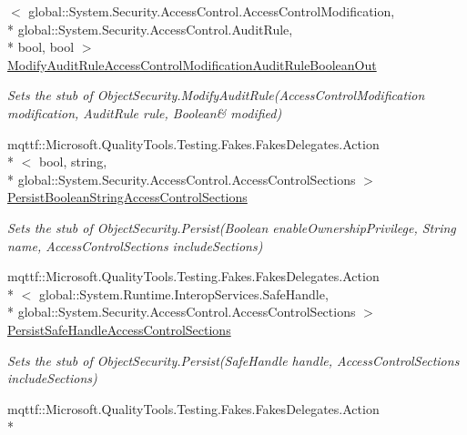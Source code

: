 \begin{DoxyCompactItemize}
$<$ global\-::\-System.\-Security.\-Access\-Control.\-Access\-Control\-Modification, \\*
global\-::\-System.\-Security.\-Access\-Control.\-Audit\-Rule, \\*
bool, bool $>$ \hyperlink{class_system_1_1_security_1_1_access_control_1_1_fakes_1_1_stub_common_object_security_aa82b9f88a60e569e45ced048289bab06}{Modify\-Audit\-Rule\-Access\-Control\-Modification\-Audit\-Rule\-Boolean\-Out}
\begin{DoxyCompactList}\small\item\em Sets the stub of Object\-Security.\-Modify\-Audit\-Rule(Access\-Control\-Modification modification, Audit\-Rule rule, Boolean\& modified)\end{DoxyCompactList}\item 
mqttf\-::\-Microsoft.\-Quality\-Tools.\-Testing.\-Fakes.\-Fakes\-Delegates.\-Action\\*
$<$ bool, string, \\*
global\-::\-System.\-Security.\-Access\-Control.\-Access\-Control\-Sections $>$ \hyperlink{class_system_1_1_security_1_1_access_control_1_1_fakes_1_1_stub_common_object_security_a03ca772cead84d5d4eb2221ffba6396b}{Persist\-Boolean\-String\-Access\-Control\-Sections}
\begin{DoxyCompactList}\small\item\em Sets the stub of Object\-Security.\-Persist(\-Boolean enable\-Ownership\-Privilege, String name, Access\-Control\-Sections include\-Sections)\end{DoxyCompactList}\item 
mqttf\-::\-Microsoft.\-Quality\-Tools.\-Testing.\-Fakes.\-Fakes\-Delegates.\-Action\\*
$<$ global\-::\-System.\-Runtime.\-Interop\-Services.\-Safe\-Handle, \\*
global\-::\-System.\-Security.\-Access\-Control.\-Access\-Control\-Sections $>$ \hyperlink{class_system_1_1_security_1_1_access_control_1_1_fakes_1_1_stub_common_object_security_a9bfcacbeb33c6c454782699bc72febac}{Persist\-Safe\-Handle\-Access\-Control\-Sections}
\begin{DoxyCompactList}\small\item\em Sets the stub of Object\-Security.\-Persist(\-Safe\-Handle handle, Access\-Control\-Sections include\-Sections)\end{DoxyCompactList}\item 
mqttf\-::\-Microsoft.\-Quality\-Tools.\-Testing.\-Fakes.\-Fakes\-Delegates.\-Action\\*

\end{DoxyCompactItemize}
